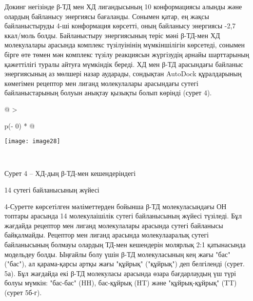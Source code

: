 Докинг негізінде β-ТД мен ХД лигандысының 10 конформациясы алынды және
олардың байланысу энергиясы бағаланды. Сонымен қатар, ең жақсы
байланыстыруды 4-ші конформация көрсетті, оның байланысу энергиясы -2,7
ккал/моль болды. Байланыстыру энергиясының теріс мәні β-ТД-мен ХД
молекулалары арасында комплекс түзілуінінің мүмкіншілігін көрсетеді,
сонымен бірге өте төмен мән комплекс түзілу реакциясын жүргізудің арнайы
шарттарының қажеттілігі туралы айтуға мүмкіндік береді. ХД мен β-ТД
арасындағы байланыс энергиясының аз мөлшері назар аударады, сондықтан
AutoDock құралдарының көмегімен рецептор мен лиганд молекулалары
арасындағы сутегі байланыстарының болуын анықтау қызықты болып көрінді
(сурет 4).

\begin{longtable}[]{@{}
  >{\raggedright\arraybackslash}p{(\columnwidth - 0\tabcolsep) * }@{}}
\toprule\noalign{}
\begin{minipage}[b]{\linewidth}\raggedright
\texttt{[image: image28]}
\end{minipage} \\
\midrule\noalign{}
\endhead
\bottomrule\noalign{}
\endlastfoot
\end{longtable}

Сурет 4 -- ХД-дың β-ТД-мен кешендеріндегі

14 сутегі байланысының жүйесі

4-Суретте көрсетілген мәліметтерден бойынша β-ТД молекуласындағы ОН
топтары арасында 14 молекулаішілік сутегі байланысының жүйесі түзіледі.
Бұл жағдайда рецептор мен лиганд молекулалары арасында сутегі байланысы
байқалмайды. Рецептор мен лиганд арасында молекулааралық сутегі
байланысының болмауы олардың ТД-мен кешендерін молярлық 2:1 қатынасында
модельдеу болды. Ыңғайлы болу үшін β-ТД молекуласының кең жағы "бас"
("бас"), ал қарама-қарсы артқы жағы "құйрық" ("құйрық") деп белгіленді
(сурет. 5а). Бұл жағдайда екі β-ТД молекуласы арасында өзара
бағдарлаудың үш түрі болуы мүмкін: "бас-бас" (HH), бас-құйрық (HT) және
"құйрық-құйрық" (TT) (сурет 5б-г).

